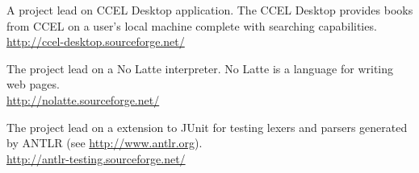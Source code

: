 \documentclass[ComputerScience]{vita}
\newcommand{\duphref}[1]{\href{#1}{#1}}
\begin{document}
\begin{vita}
\begin{software}
	\item A project lead on CCEL Desktop application.  The CCEL Desktop provides books from CCEL on a user's local machine complete with searching capabilities.  \\\duphref{http://ccel-desktop.sourceforge.net/}
	\item The project lead on a No Latte interpreter.  No Latte is a language for writing web pages.  \\\duphref{http://nolatte.sourceforge.net/}
  \item The project lead on a extension to JUnit for testing lexers and parsers generated by ANTLR (see \duphref{http://www.antlr.org}).  \\\duphref{http://antlr-testing.sourceforge.net/}
\end{software}









\end{vita}
\end{document}
